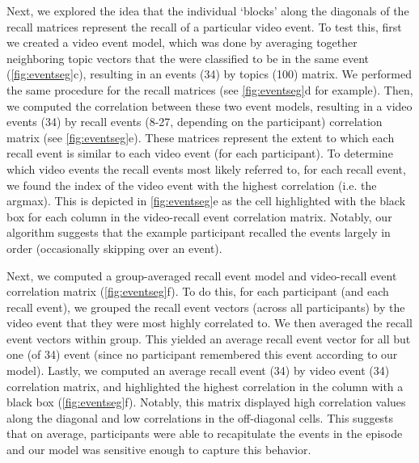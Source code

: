 \documentclass{article}
\begin{document}
{Next, we explored the idea that the individual `blocks' along the diagonals of the recall matrices represent the recall of a particular video event. To test this, first we created a video event model, which was done by averaging together neighboring topic vectors that the were classified to be in the same event (\ref{fig:eventseg}c), resulting in an events (34) by topics (100) matrix.  We performed the same procedure for the recall matrices (see \ref{fig:eventseg}d for example). Then, we computed the correlation between these two event models, resulting in a video events (34) by recall events (8-27, depending on the participant) correlation matrix (see \ref{fig:eventseg}e). These matrices represent the extent to which each recall event is similar to each video event (for each participant). To determine which video events the recall events most likely referred to, for each recall event, we found the index of the video event with the highest correlation (i.e. the argmax).  This is depicted in \ref{fig:eventseg}e as the cell highlighted with the black box for each column in the video-recall event correlation matrix. Notably, our algorithm suggests that the example participant recalled the events largely in order (occasionally skipping over an event).

Next, we computed a group-averaged recall event model and video-recall event correlation matrix (\ref{fig:eventseg}f).  To do this, for each participant (and each recall event), we grouped the recall event vectors (across all participants) by the video event that they were most highly correlated to. We then averaged the recall event vectors within group. This yielded an average recall event vector for all but one (of 34) event (since no participant remembered this event according to our model). Lastly, we computed an average recall event (34) by video event (34) correlation matrix, and highlighted the highest correlation in the column with a black box (\ref{fig:eventseg}f). Notably, this matrix displayed high correlation values along the diagonal and low correlations in the off-diagonal cells. This suggests that on average, participants were able to recapitulate the events in the episode and our model was sensitive enough to capture this behavior.

}
\end{document}

